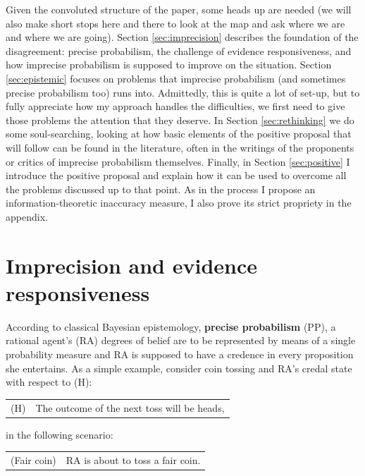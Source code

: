 \documentclass[
  10pt,
  dvipsnames,enabledeprecatedfontcommands]{scrartcl}
\begin{document}
Given the convoluted structure of the paper, some heads up are needed
(we will also make short stops here and there to look at the map and ask
where we are and where we are going). Section \ref{sec:imprecision}
describes the foundation of the disagreement: precise probabilism, the
challenge of evidence responsiveness, and how imprecise probabilism is
supposed to improve on the situation. Section \ref{sec:epistemic}
focuses on problems that imprecise probabilism (and sometimes precise
probabilism too) runs into. Admittedly, this is quite a lot of set-up,
but to fully appreciate how my approach handles the difficulties, we
first need to give those problems the attention that they deserve. In
Section \ref{sec:rethinking} we do some soul-searching, looking at how
basic elements of the positive proposal that will follow can be found in
the literature, often in the writings of the proponents or critics of
imprecise probabilism themselves. Finally, in Section \ref{sec:positive}
I introduce the positive proposal and explain how it can be used to
overcome all the problems discussed up to that point. As in the process
I propose an information-theoretic inaccuracy measure, I also prove its
strict propriety in the appendix.

\hypertarget{imprecision-and-evidence-responsiveness}{%
\section{\texorpdfstring{Imprecision and evidence responsiveness
\label{sec:imprecision}}{Imprecision and evidence responsiveness }}\label{imprecision-and-evidence-responsiveness}}

According to classical Bayesian epistemology,
\textbf{precise probabilism} (PP), a rational agent's (RA) degrees of
belief are to be represented by means of a single probability measure
and RA is supposed to have a credence in every proposition she
entertains. As a simple example, consider coin tossing and RA's credal
state with respect to (H):

\begin{center}
\begin{tabular}{lp{9cm}}
(H) & The outcome of the next toss will be heads,
\end{tabular}
\end{center}

\noindent in the following scenario:

\begin{center}
\begin{tabular}{lp{9cm}}
(Fair coin) & RA is about to toss a fair coin.
\end{tabular}
\end{center}
\end{document}
